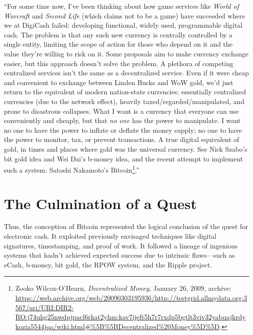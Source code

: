 \documentclass[
  a5paper,
  smalldemyvopaper,10pt,twoside,onecolumn,openright,extrafontsizes,hidelinks]{memoir}
\begin{document}
``For some time now, I've been thinking about how game services like
\emph{World of Warcraft} and \emph{Second Life} (which claims not to be
a game) have succeeded where we at DigiCash failed: developing
functional, widely used, programmable digital cash. The problem is that
any such new currency is centrally controlled by a single entity,
limiting the scope of action for those who depend on it and the value
they're willing to risk on it. Some proposals aim to make currency
exchange easier, but this approach doesn't solve the problem. A plethora
of competing centralized services isn't the same as a decentralized
service. Even if it were cheap and convenient to exchange between Linden
Bucks and WoW gold, we'd just return to the equivalent of modern
nation-state currencies: essentially centralized currencies (due to the
network effect), heavily taxed/regarded/manipulated, and prone to
disastrous collapses. What I want is a currency that everyone can use
conveniently and cheaply, but that \emph{no one} has the power to
manipulate. I want no one to have the power to inflate or deflate the
money supply; no one to have the power to monitor, tax, or prevent
transactions. A true digital equivalent of gold, in times and places
where gold was the universal currency. See Nick Szabo's bit gold idea
and Wei Dai's b-money idea, and the recent attempt to implement such a
system: Satoshi Nakamoto's Bitcoin\footnote{Zooko Wilcox-O'Hearn,
  \emph{Decentralized Money}, January 26, 2009, archive:
  \url{https://web.archive.org/web/20090303195936/http://testgrid.allmydata.org:3567/uri/URI:DIR2-RO:j74uhg25nwdpjpacl6rkat2yhm:kav7ijeft5h7r7rxdp5bgtlt3viv32yabqajkrdykozia5544jqa/wiki.html\#\%5B\%5BDecentralized\%20Money\%5D\%5D}.}.''

\section*{The Culmination of a Quest}\label{the-culmination-of-a-quest}


Thus, the conception of Bitcoin represented the logical conclusion of
the quest for electronic cash. It exploited previously envisaged
techniques like digital signatures, timestamping, and proof of work. It
followed a lineage of ingenious systems that hadn't achieved expected
success due to intrinsic flaws---such as eCash, b-money, bit gold, the
RPOW system, and the Ripple project.
\end{document}
